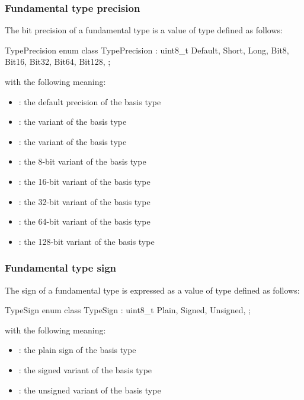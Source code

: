 
\subsubsection{Fundamental type precision}
\label{sec:ifc-fundamental-type-precision}

The bit precision of a fundamental type is a value of type  defined as follows:
%
\begin{typedef}{TypePrecision}{}
	enum class TypePrecision : uint8_t {
		Default,
		Short,
		Long,
		Bit8,
		Bit16,
		Bit32,
		Bit64,
		Bit128,
	};
\end{typedef}
%
with the following meaning:
\begin{itemize}
  \item {}: the default precision of the basis type
  \item {}: the  variant of the basis type
  \item {}: the  variant of the basis type
  \item {}: the 8-bit variant of the basis type
  \item {}: the 16-bit variant of the basis type
  \item {}: the 32-bit variant of the basis type
  \item {}: the 64-bit variant of the basis type
  \item {}: the 128-bit variant of the basis type
\end{itemize}


\subsubsection{Fundamental type sign}
\label{sec:ifc-fundamental-type-sign}
The sign of a fundamental type is expressed as a value of type  defined as follows:
%
\begin{typedef}{TypeSign}{}
	enum class TypeSign : uint8_t {
		Plain,
		Signed,
		Unsigned,
	};
\end{typedef}
%
with the following meaning:
\begin{itemize}
  \item {}: the plain sign of the basis type
  \item {}: the signed variant of the basis type
  \item {}: the unsigned variant of the basis type
\end{itemize}



